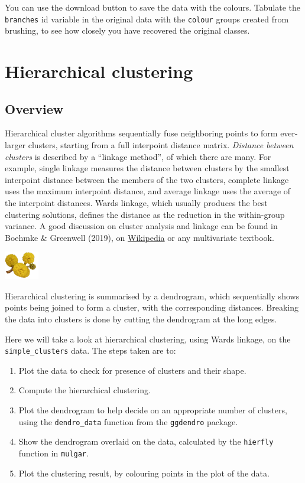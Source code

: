 \documentclass[
  letterpaper,
]{krantz}
\providecommand{\tightlist}{%
  \setlength{\itemsep}{0pt}\setlength{\parskip}{0pt}}\usepackage{longtable,booktabs,array}
\newcommand{\infobox}[1]{%
\noindent\colorbox{info!30}{%
\begin{minipage}{0.98\linewidth}%
    \centering%
    \begin{minipage}[c]{0.15\linewidth} %
      \includegraphics[width=1.5cm]{images/mulga-flowers2.png} %
    \end{minipage}%
    \hfill %
    \begin{minipage}[c]{0.8\linewidth} %
      \bigskip%
      \textsf{#1}%
      \bigskip%
    \end{minipage}%
    \hspace*{3mm}%
  \end{minipage}%
}%
}
\begin{document}
You can use the download button to save the data with the colours.
Tabulate the \texttt{branches} id variable in the original data with the
\texttt{colour} groups created from brushing, to see how closely you
have recovered the original classes.


\chapter{Hierarchical clustering}\label{sec-hclust}



\section{Overview}\label{overview}

Hierarchical cluster algorithms sequentially fuse neighboring points to
form ever-larger clusters, starting from a full interpoint distance
matrix. \emph{Distance between clusters} is described by a ``linkage
method'', of which there are many. For example, single linkage measures
the distance between clusters by the smallest interpoint distance
between the members of the two clusters, complete linkage uses the
maximum interpoint distance, and average linkage uses the average of the
interpoint distances. Wards linkage, which usually produces the best
clustering solutions, defines the distance as the reduction in the
within-group variance. A good discussion on cluster analysis and linkage
can be found in Boehmke \& Greenwell (2019), on
\href{https://en.wikipedia.org/wiki/Cluster_analysis}{Wikipedia} or any
multivariate textbook.

\infobox{Hierarchical clustering is summarised by a dendrogram, which sequentially shows points being joined to form a cluster, with the corresponding distances. Breaking the data into clusters is done by cutting the dendrogram at the long edges.}

Here we will take a look at hierarchical clustering, using Wards
linkage, on the \texttt{simple\_clusters} data. The steps taken are to:

\begin{enumerate}
\def\labelenumi{\arabic{enumi}.}
\tightlist
\item
  Plot the data to check for presence of clusters and their shape.
\item
  Compute the hierarchical clustering.
\item
  Plot the dendrogram to help decide on an appropriate number of
  clusters, using the \texttt{dendro\_data} function from the
  \texttt{ggdendro} package.
\item
  Show the dendrogram overlaid on the data, calculated by the
  \texttt{hierfly} function in \texttt{mulgar}.
\item
  Plot the clustering result, by colouring points in the plot of the
  data.
\end{enumerate}
\end{document}
